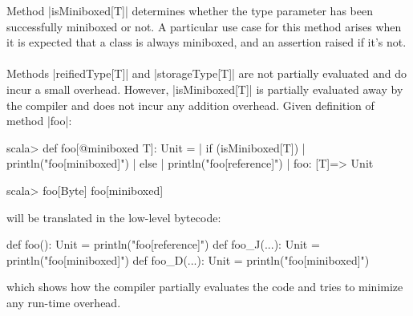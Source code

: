 Method |isMiniboxed[T]| determines whether the type parameter has been successfully miniboxed or not. A particular use case for this method arises when it is expected that a class is always miniboxed, and an assertion raised if it's not.


\paragraph{}
Methods |reifiedType[T]| and |storageType[T]| are not partially evaluated and do incur a small overhead. However, |isMiniboxed[T]| is partially evaluated away by the compiler and does not incur any addition overhead. Given definition of method |foo|:

\begin{lstlisting-nobreak}
scala> def foo[@miniboxed T]: Unit = {
    |   if (isMiniboxed[T])
    |     println("foo[miniboxed]")
    |   else
    |     println("foo[reference]")
    | }
	foo: [T]=> Unit

scala> foo[Byte]
	foo[miniboxed]
\end{lstlisting-nobreak}

will be translated in the low-level bytecode:

\begin{lstlisting-nobreak}
def foo(): Unit = println("foo[reference]")
def foo_J(...): Unit = println("foo[miniboxed]")
def foo_D(...): Unit = println("foo[miniboxed]")
\end{lstlisting-nobreak}

which shows how the compiler partially evaluates the code and tries to minimize any run-time overhead.
